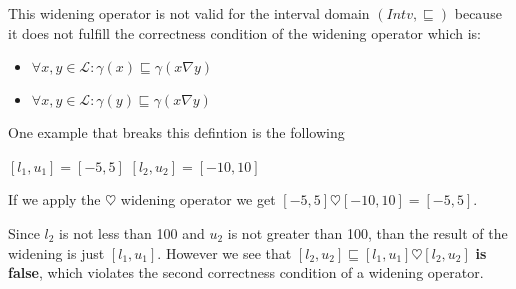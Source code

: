 \documentclass[12pt]{article}
\begin{document}
\begin{enumerate}
\begin{mdframed}
    This widening operator is not valid for the interval domain $(Intv, \sqsubseteq)$ because it does not fulfill the correctness condition of the widening operator which is:

    \begin{itemize}
          \item $\forall x, y \in \mathcal{L} : \gamma(x) \sqsubseteq \gamma(x \nabla y)$
          \item $\forall x, y \in \mathcal{L} : \gamma(y) \sqsubseteq \gamma(x \nabla y)$
    \end{itemize}

    One example that breaks this defintion is the following

    $[l_1,u_1] = [-5,5]$
    $[l_2, u_2] = [-10,10]$

    If we apply the $\heartsuit$ widening operator we get $[-5,5] \heartsuit [-10,10] = [-5,5]$.

    Since $l_2$ is not less than 100 and $u_2$ is not greater than 100, than the result of the widening is just $[l_1,u_1]$. However we see that $[l_2,u_2] \sqsubseteq [l_1, u_1] \heartsuit [l_2, u_2]$ \textbf{is false}, which violates the second correctness condition of a widening operator. 
     
   \end{mdframed}

\end{enumerate}
    
\end{document}
